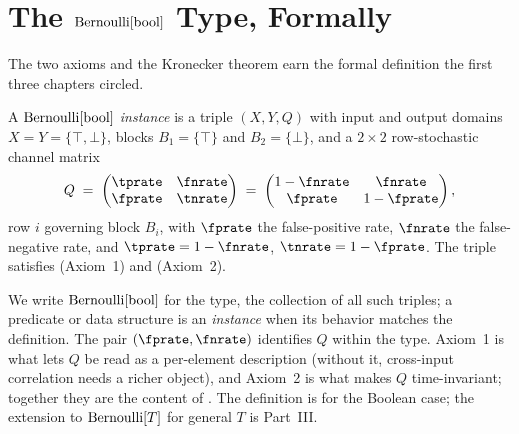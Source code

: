 %

\section{The \texorpdfstring{$\Bernoulli{\BoolType}$}{Bernoulli[bool]} Type, Formally}
\label{sec:bernoulli-bool-formal}

The two axioms and the Kronecker theorem earn the formal definition the first
three chapters circled.

\begin{definition}[$\Bernoulli{\BoolType}$]
\label{def:bernoulli-bool}
A \emph{$\Bernoulli{\BoolType}$ instance} is a triple $(X, Y, Q)$ with input and
output domains $X = Y = \{\top, \bot\}$, blocks $B_1 = \{\top\}$ and
$B_2 = \{\bot\}$, and a $2 \times 2$ row-stochastic channel matrix
\[
  Q \;=\;
  \begin{pmatrix}
    \tprate & \fnrate \\
    \fprate & \tnrate
  \end{pmatrix}
  \;=\;
  \begin{pmatrix}
    1 - \fnrate & \fnrate \\
    \fprate & 1 - \fprate
  \end{pmatrix},
\]
row $i$ governing block $B_i$, with $\fprate$ the false-positive rate, $\fnrate$
the false-negative rate, and $\tprate = 1 - \fnrate$, $\tnrate = 1 - \fprate$.
The triple satisfies  (Axiom~1) and
 (Axiom~2).
\end{definition}

We write $\Bernoulli{\BoolType}$ for the type, the collection of all such
triples; a predicate or data structure is an \emph{instance} when its behavior
matches the definition. The pair $(\fprate, \fnrate)$ identifies $Q$ within the
type. Axiom~1 is what lets $Q$ be read as a per-element description (without it,
cross-input correlation needs a richer object), and Axiom~2 is what makes $Q$
time-invariant; together they are the content of
. The definition is for the Boolean case; the
extension to $\mathrm{Bernoulli}[T]$ for general $T$ is Part~III.

